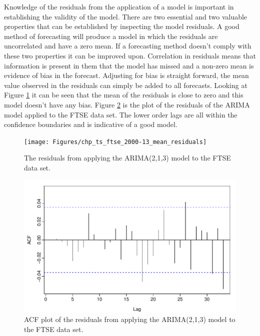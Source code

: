 Knowledge of the residuals from the application of a model is important in establishing the validity of the model. There are two essential and two valuable properties that can be established by inspecting the model residuals. A good method of forecasting will produce a model in which the residuals are uncorrelated and have a zero mean. If a forecasting method doesn't comply with these two properties it can be improved upon. Correlation in residuals means that information is present in them that the model has missed and a non-zero mean is evidence of bias in the forecast. Adjusting for bias is straight forward, the mean value observed in the residuals can simply be added to all forecasts. Looking at Figure \ref{fig:chp_ts_ftse_2000_13_mean_residuals} it can be seen that the mean of the residuals is close to zero and this model doesn't have any bias. Figure \ref{fig:chp_ts_ftse_2000_13_acf_residuals} is the plot of the residuals of the ARIMA model applied to the FTSE data set. The lower order lags are all within the confidence boundaries and is indicative of a good model.

\begin{figure}[!tbh]
\centering
\texttt{[image: Figures/chp\_ts\_ftse\_2000-13\_mean\_residuals]}
\caption[FTSE 100 ARIMA model residuals.]{The residuals from applying the ARIMA(2,1,3) model to the FTSE data set.}
\label{fig:chp_ts_ftse_2000_13_mean_residuals}
\end{figure}

\begin{figure}[!tbh]
\centering
\includegraphics{Figures/chp_ts_ftse_2000-13_acf_residuals}
\caption[ACF of FTSE 100 ARIMA model residuals.]{ACF plot of the residuals from applying the ARIMA(2,1,3) model to the FTSE data set.}
\label{fig:chp_ts_ftse_2000_13_acf_residuals}
\end{figure}

